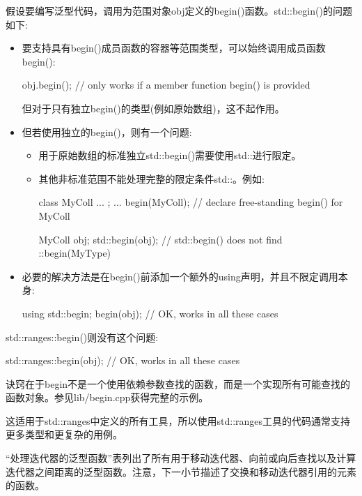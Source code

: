 假设要编写泛型代码，调用为范围对象obj定义的begin()函数。std::begin()的问题如下:

\begin{itemize}
\item
要支持具有begin()成员函数的容器等范围类型，可以始终调用成员函数begin():

\begin{cpp}
obj.begin(); // only works if a member function begin() is provided
\end{cpp}

但对于只有独立begin()的类型(例如原始数组)，这不起作用。

\item
但若使用独立的begin()，则有一个问题:

\begin{itemize}
\item
用于原始数组的标准独立std::begin()需要使用std::进行限定。

\item
其他非标准范围不能处理完整的限定条件std::。例如:

\begin{cpp}
class MyColl {
	...
};
... begin(MyColl); // declare free-standing begin() for MyColl

MyColl obj;
std::begin(obj); // std::begin() does not find ::begin(MyType)
\end{cpp}
\end{itemize}

\item
必要的解决方法是在begin()前添加一个额外的using声明，并且不限定调用本身:

\begin{cpp}
using std::begin;
begin(obj); // OK, works in all these cases
\end{cpp}
\end{itemize}

std::ranges::begin()则没有这个问题:

\begin{cpp}
std::ranges::begin(obj); // OK, works in all these cases
\end{cpp}

诀窍在于begin不是一个使用依赖参数查找的函数，而是一个实现所有可能查找的函数对象。参见lib/begin.cpp获得完整的示例。

这适用于std::ranges中定义的所有工具，所以使用std::ranges工具的代码通常支持更多类型和更复杂的用例。


“处理迭代器的泛型函数”表列出了所有用于移动迭代器、向前或向后查找以及计算迭代器之间距离的泛型函数。注意，下一小节描述了交换和移动迭代器引用的元素的函数。

